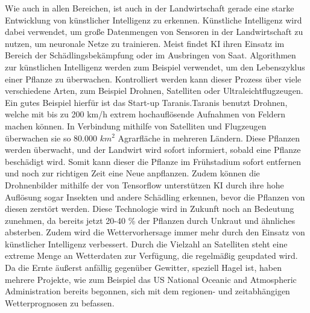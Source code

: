 Wie auch in allen Bereichen, ist auch in der Landwirtschaft gerade eine
starke Entwicklung von künstlicher Intelligenz zu erkennen. Künstliche
Intelligenz wird dabei verwendet, um große Datenmengen von Sensoren in der
Landwirtschaft zu nutzen, um neuronale Netze zu trainieren. Meist findet KI
ihren Einsatz im Bereich der Schädlingsbekämpfung oder im Ausbringen von
Saat.\cite{mci/Mohr2020} Algorithmen zur künstlichen Intelligenz werden zum
Beispiel verwendet, um den Lebenszyklus einer Pflanze zu überwachen.
Kontrolliert werden kann dieser Prozess über viele verschiedene Arten, zum
Beispiel Drohnen, Satelliten oder Ultraleichtflugzeugen. Ein gutes Beispiel
hierfür ist das Start-up Taranis.Taranis benutzt Drohnen, welche mit bis zu
200 km/h extrem hochauflösende Aufnahmen von Feldern machen können. In
Verbindung mithilfe von Satelliten und Flugzeugen überwachen sie so 80.000
$km^2$ Agrarfläche in mehreren Ländern. Diese Pflanzen werden
überwacht, und der Landwirt wird sofort informiert, sobald eine Pflanze
beschädigt wird. Somit kann dieser die Pflanze im Frühstadium sofort entfernen
und noch zur richtigen Zeit eine Neue anpflanzen. Zudem können die
Drohnenbilder mithilfe der von Tensorflow unterstützen KI durch ihre hohe
Auflösung sogar Insekten und andere Schädling erkennen, bevor die Pflanzen von
diesen zerstört werden. Diese Technologie wird in Zukunft noch an Bedeutung
zunehmen, da bereits jetzt 20-40 \% der Pflanzen durch Unkraut und
ähnliches absterben. Zudem wird die Wettervorhersage immer mehr durch den
Einsatz von künstlicher Intelligenz verbessert. Durch die Vielzahl an
Satelliten steht eine extreme Menge an Wetterdaten zur Verfügung, die
regelmäßig geupdated wird. Da die Ernte äußerst anfällig gegenüber Gewitter,
speziell Hagel ist, haben mehrere Projekte, wie zum Beispiel das US National
Oceanic and Atmospheric Administration bereits begonnen, sich mit dem regionen-
und zeitabhängigen Wetterprognosen zu befassen.\cite{wennker2020kunstliche}
